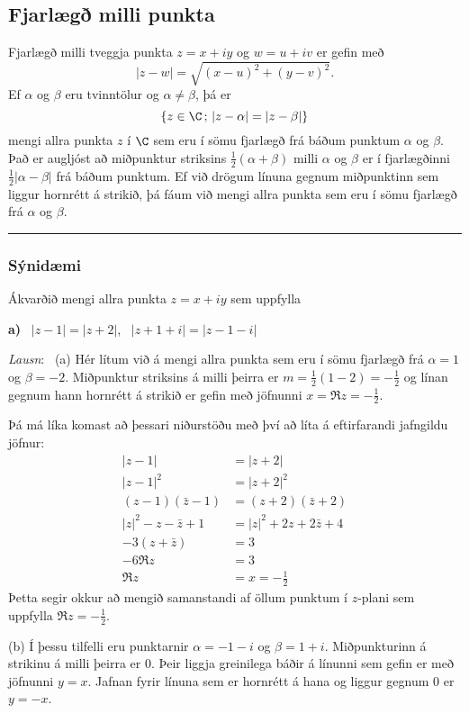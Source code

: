 \subsection*{Fjarlægð milli punkta}

Fjarlægð milli tveggja punkta $z=x+iy$ og $w=u+iv$ er gefin með
$$
|z-w|=\sqrt{(x-u)^2+(y-v)^2}.
$$
Ef $\alpha$ og $\beta$ eru tvinntölur og $\alpha\neq
\beta$, þá er 
$$\{z\in \C\,;\, |z-\alpha|=|z-\beta|\}
$$ mengi allra punkta
$z$ í $\C$ sem eru í sömu fjarlægð frá báðum punktum $\alpha$ og
$\beta$.  Það er augljóst að miðpunktur striksins $\frac
12(\alpha+\beta)$ milli $\alpha$ og $\beta$ er í fjarlægðinni
$\frac 12|\alpha-\beta|$ frá báðum punktum.  Ef við drögum línuna 
gegnum miðpunktinn sem
liggur hornrétt á strikið, þá fáum við mengi allra punkta sem eru í
sömu fjarlægð frá $\alpha$ og $\beta$.

\bigskip\hrule\bigskip

\subsubsection{Sýnidæmi}  Ákvarðið mengi allra punkta $z=x+iy$ sem uppfylla

\smallskip
{\bf a)} \ $|z-1|=|z+2|$,  \ $|z+1+i|=|z-1-i|$


\medskip
{\it Lausn}: \ (a) Hér lítum við á mengi allra punkta 
sem eru í sömu fjarlægð frá $\alpha=1$ og $\beta=-2$.  Miðpunktur
striksins á milli þeirra er $m=\tfrac 12(1-2)=-\tfrac 12$ og línan
gegnum hann hornrétt á strikið er gefin með jöfnunni $x=\Re z=-\tfrac
12$.


Þá má líka komast að þessari niðurstöðu með því að líta á
eftirfarandi jafngildu jöfnur:
\begin{align*}
|z-1|&=|z+2| \\
|z-1|^2&=|z+2|^2 \\
(z-1)(\bar z-1)&=(z+2)(\bar z+2) \\
|z|^2-z-\bar z+1&=|z|^2+2z+2\bar z+4\\
-3(z+\bar z)&=3\\
-6\Re z&=3\\
\Re z&=x=-\tfrac 12
\end{align*} 
Þetta segir okkur að mengið samanstandi  af öllum punktum 
í $z$-plani sem uppfylla $\Re z=-\tfrac 12$.

\smallskip\noindent
(b) Í þessu tilfelli eru punktarnir $\alpha=-1-i$ og $\beta=1+i$.
Miðpunkturinn á strikinu á milli þeirra er $0$.  Þeir liggja
greinilega báðir á línunni sem gefin er með jöfnunni $y=x$. Jafnan
fyrir línuna sem er hornrétt á hana og liggur gegnum $0$ er
$y=-x$.

